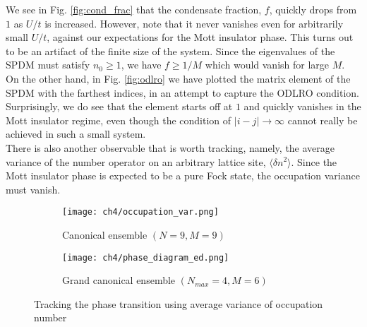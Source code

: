 We see in Fig. \ref{fig:cond_frac} that the condensate fraction, $f$, quickly drops from $1$ as $U/t$ is increased. However, note that it never vanishes even for arbitrarily small $U/t$, against our expectations for the Mott insulator phase. This turns out to be an artifact of the finite size of the system. Since the eigenvalues of the SPDM must satisfy $n_0 \geq 1$, we have $f \geq 1/M$ which would vanish for large $M$. 
\vspace{0.5cm}\\
On the other hand, in Fig. \ref{fig:odlro} we have plotted the matrix element of the SPDM with the farthest indices, in an attempt to capture the ODLRO condition. Surprisingly, we do see that the element starts off at $1$ and quickly vanishes in the Mott insulator regime, even though the condition of $|i-j| \to \infty$ cannot really be achieved in such a small system.
\vspace{0.5cm}\\
There is also another observable that is worth tracking, namely, the average variance of the number operator on an arbitrary lattice site, $\langle \delta n^2\rangle$. Since the Mott insulator phase is expected to be a pure Fock state, the occupation variance must vanish. 

\begin{figure}[!htb]
    \centering
    \begin{subfigure}[b]{0.52\textwidth}  %
        \centering
        \texttt{[image: ch4/occupation\_var.png]}
        \caption{Canonical ensemble $(N=9, M=9)$}
        \label{fig:occ_var}
    \end{subfigure}
    \hspace{1em}  %
    \begin{subfigure}[b]{0.38\textwidth}
        \centering
        \texttt{[image: ch4/phase\_diagram\_ed.png]}
        \caption{ Grand canonical ensemble $(N_{max} = 4, M = 6)$}
        \label{fig:phasediagram_ed}
    \end{subfigure}
    \caption{Tracking the phase transition using average variance of occupation number}
    \label{}
\end{figure}
\FloatBarrier \!\!\!\!\!\!\!\!\!\!\!

